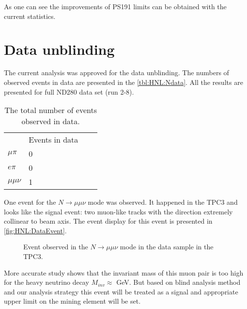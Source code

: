 \documentclass[../main.tex]{subfiles}
\begin{document}
As one can see the improvements of PS191 limits can be obtained with the current statistics.

\section{Data unblinding}
The current analysis was approved for the data unblinding. The numbers of observed events in data are presented in the \autoref{tbl:HNL:Ndata}. All the results are presented for full ND280 data set (run 2-8).

\begin{table}[!ht]
\begin{center}
\begin{tabular}{llll}
                            & Events in data      \\
  $\mu\pi$ \hspace{0.5cm}   & 0  \hspace{2cm}     \\
  $e\pi$                    & 0                   \\
  $\mu\mu\nu$               & 1                   \\
\end{tabular}
\caption{The total number of events observed in data.}
\label{tbl:HNL:Ndata}
\end{center}
\end{table}

One event for the $N\to\mu\mu\nu$ mode was observed. It happened in the TPC3 and looks like the signal event: two muon-like tracks with the direction extremely collinear to beam axis. The event display for this event is presented in \autoref{fig:HNL:DataEvent}.

\begin{figure}[!ht]
    \begin{center}
  \begin{minipage}{0.49\linewidth}
  \end{minipage}
  \begin{minipage}{0.49\linewidth}
  \end{minipage}
  \caption{Event observed in the $N\to\mu\mu\nu$ mode in the data sample in the TPC3.}
  \label{fig:HNL:DataEvent}
  \end{center}
\end{figure}

More accurate study shows that the invariant mass of this muon pair is too high for the heavy neutrino decay $M_{inv}\approx$ GeV. But based on blind analysis method and our analysis strategy this event will be treated as a signal and appropriate upper limit on the mining element will be set.
\end{document}
